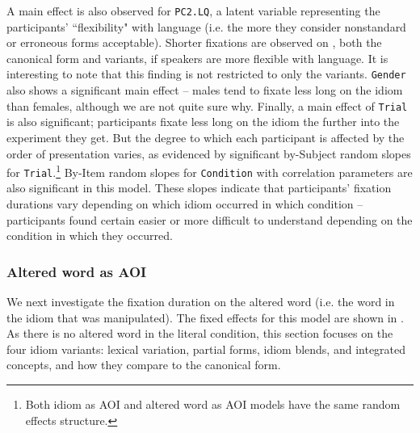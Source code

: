 \documentclass[output=paper
,modfonts
,nonflat]{langsci/langscibook}
\begin{document}
A main effect is also observed for \texttt{PC2.LQ}, a latent variable representing the participants' ``flexibility" with language (i.e. the more they consider nonstandard or erroneous forms acceptable).  Shorter fixations are observed on , both the canonical form and variants, if speakers are more flexible with language. It is interesting to note that this finding is not  restricted to only the variants. \texttt{Gender} also shows a significant main effect -- males tend to fixate less long on the idiom than females, although we are not quite sure why. Finally, a main effect of \texttt{Trial} is also significant; participants fixate less long on the idiom the further into the experiment they get. But the degree to which each participant is affected by the order of presentation varies, as evidenced by significant by-Subject random slopes for \texttt{Trial}.\footnote{Both idiom as AOI and altered word as AOI models have the same random effects structure.} By-Item random slopes for \texttt{Condition} with correlation parameters are also significant in this model. These slopes indicate that participants' fixation durations vary depending on which idiom occurred in which condition -- participants found certain  easier or more difficult to understand  depending on the condition in which they occurred. 



\subsubsection{Altered word as AOI}

We next investigate the fixation duration on the altered word (i.e. the word in the idiom  that was manipulated). The fixed effects for this model are shown in . As there is no altered word in the literal condition, this section focuses on the four idiom variants: lexical variation, partial forms, idiom  blends, and integrated  concepts, and how they compare to the canonical form. 
\end{document}
